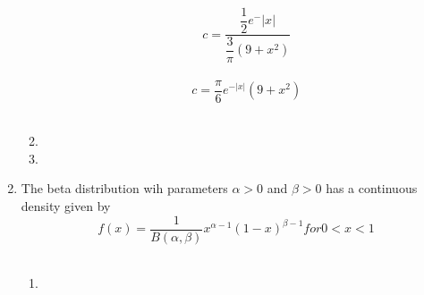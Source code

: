 \documentclass[letterpaper]{article}
\begin{document}
\begin{enumerate}
\begin{enumerate}
\begin{equation*}
c= \dfrac{\dfrac{1}{2} e^-|x|}{\dfrac{3}{\pi}(9+x^2)}
\end{equation*}\\

\begin{equation*}
c = \dfrac{\pi}{6}e^{-|x|}(9+x^2)
\end{equation*}\\

\item


\item










\end{enumerate}



\item The beta distribution wih parameters $ \alpha > 0 $ and $\beta >0 $ has a continuous density given by 
\begin{equation*}
f(x) = \dfrac{1}{B(\alpha , \beta)}x^{\alpha-1}(1-x)^{\beta -1} for 0<x<1
\end{equation*}\\

\begin{enumerate}

\item






















\end{enumerate}
\end{enumerate}
\end{document}

